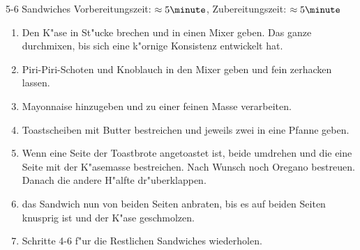 5-6 Sandwiches \hfill Vorbereitungszeit: $\approx5 \minute$, Zubereitungszeit: $\approx5 \minute$
\hspace{0em}\\
\begin{enumerate}
\item   Den K"ase in St"ucke brechen und in einen Mixer geben. Das ganze durchmixen, bis
        sich eine k"ornige Konsistenz entwickelt hat.
\item   Piri-Piri-Schoten und Knoblauch in den Mixer geben und fein zerhacken lassen.
\item   Mayonnaise hinzugeben und zu einer feinen Masse verarbeiten.
\item   Toastscheiben mit Butter bestreichen und jeweils zwei in eine Pfanne geben.
\item   Wenn eine Seite der Toastbrote angetoastet ist, beide umdrehen und die eine Seite
        mit der K"asemasse bestreichen. Nach Wunsch noch Oregano bestreuen. Danach die andere
        H"alfte dr"uberklappen.
\item   das Sandwich nun von beiden Seiten anbraten, bis es auf beiden Seiten knusprig ist und
        der K"ase geschmolzen.
\item   Schritte 4-6 f"ur die Restlichen Sandwiches wiederholen.
\end{enumerate}

